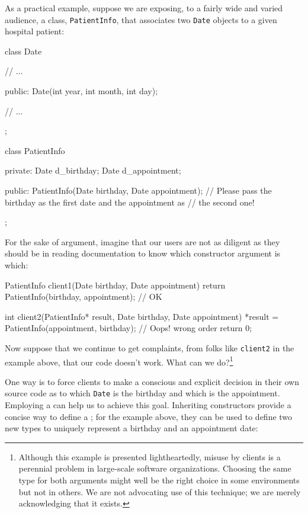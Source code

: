 As a practical example, suppose we are exposing, to a fairly wide and varied audience, a class,
\lstinline!PatientInfo!, that associates two \lstinline!Date! objects to a
given hospital patient:

\begin{emcppslisting}[emcppsbatch=e5]
class Date
{
    // ...

public:
    Date(int year, int month, int day);

    // ...
};

class PatientInfo
{
private:
    Date d_birthday;
    Date d_appointment;

public:
    PatientInfo(Date birthday, Date appointment);
        // Please pass the birthday as the first date and the appointment as
        // the second one!
};
\end{emcppslisting}
    
\noindent For the sake of argument, imagine that our users are not as diligent as
they should be in reading documentation to know which constructor
argument is which:

\begin{emcppslisting}[emcppsbatch=e5]
PatientInfo client1(Date birthday, Date appointment)
{
    return PatientInfo(birthday, appointment);  // OK
}

int client2(PatientInfo* result, Date birthday, Date appointment)
{
    *result = PatientInfo(appointment, birthday);  // Oops! wrong order
    return 0;
}
\end{emcppslisting}
    
\noindent Now suppose that we continue to get complaints, from folks like
\lstinline!client2! in the example above, that our code doesn't work. What can we
do?{\cprotect\footnote{Although this example is presented lightheartedly, misuse by clients is a perennial problem in large-scale
software organizations. Choosing the same type for both arguments
might well be the right choice in some environments but not in others.
We are not advocating use of this technique; we are merely
  acknowledging that it exists.}}

One way is to force clients to make a conscious and explicit decision in
their own source code as to which \lstinline!Date! is the birthday and
which is the appointment. Employing a 
can help us to achieve this goal. Inheriting constructors provide a
concise way to define a ; for
the example above, they can be used to define two new types to
 uniquely represent a birthday and an appointment date:

